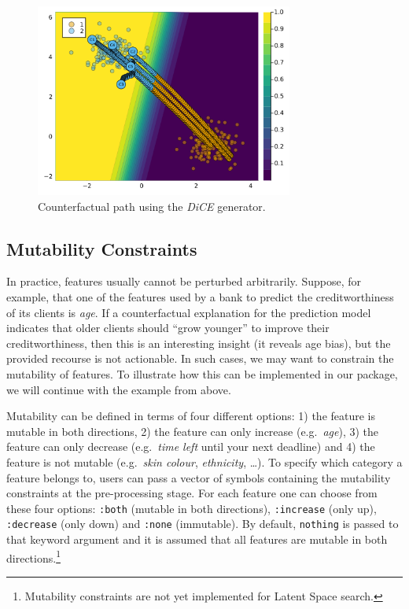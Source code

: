 \documentclass{juliacon}
\begin{document}
\begin{figure}

{\centering \includegraphics[width=3.33333in,height=2.5in]{www/binary_advanced.png}

}

\caption{\label{fig-binary-advanced}Counterfactual path using the
\emph{DiCE} generator.}

\end{figure}

\hypertarget{sec-mut}{%
\subsection{Mutability Constraints}\label{sec-mut}}

In practice, features usually cannot be perturbed arbitrarily. Suppose,
for example, that one of the features used by a bank to predict the
creditworthiness of its clients is \emph{age}. If a counterfactual
explanation for the prediction model indicates that older clients should
``grow younger'' to improve their creditworthiness, then this is an
interesting insight (it reveals age bias), but the provided recourse is
not actionable. In such cases, we may want to constrain the mutability
of features. To illustrate how this can be implemented in our package,
we will continue with the example from above.

Mutability can be defined in terms of four different options: 1) the
feature is mutable in both directions, 2) the feature can only increase
(e.g.~\emph{age}), 3) the feature can only decrease (e.g.~\emph{time
left} until your next deadline) and 4) the feature is not mutable
(e.g.~\emph{skin colour}, \emph{ethnicity}, \ldots). To specify which
category a feature belongs to, users can pass a vector of symbols
containing the mutability constraints at the pre-processing stage. For
each feature one can choose from these four options: \texttt{:both}
(mutable in both directions), \texttt{:increase} (only up),
\texttt{:decrease} (only down) and \texttt{:none} (immutable). By
default, \texttt{nothing} is passed to that keyword argument and it is
assumed that all features are mutable in both directions.\footnote{Mutability
  constraints are not yet implemented for Latent Space search.}
\end{document}
